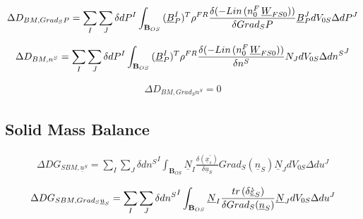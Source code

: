 \documentclass[12pt]{article}
\begin{document}
	\begin{equation*}
		\begin{aligned}
			\Delta D_{BM,  {Grad_{S}}P}=\sum_{I}\sum_{J}{\delta dP^{I}}\int_{\mathbf{B}_{OS}}{{(\underline{B}_{P}^{I})^{T}}{\rho^{FR}}}{\frac{\delta (-Lin\hspace{0.5mm} ({n_{0}^{F}}\hspace{0.5mm}{\underline{W}_{FS0}}))}{\delta {Grad_{S}}P }}{\underline{B}_{P}^{J}}{dV_{0S}}{\Delta dP^{J}}
		\end{aligned}    
	\end{equation*}
	
	\begin{equation*}
		\begin{aligned}
			\Delta D_{BM,  n^{S}}=\sum_{I}\sum_{J}{\delta dP^{I}}\int_{\mathbf{B}_{OS}}{{(\underline{B}_{P}^{I})^{T}}{\rho^{FR}}}{\frac{\delta (-Lin\hspace{0.5mm} ({n_{0}^{F}}\hspace{0.5mm}{\underline{W}_{FS0}}))}{\delta n^{S}}}{N_{J}}{dV_{0S}}{\Delta d{n^{S}}^{J}}
		\end{aligned}    
	\end{equation*}
	
	\begin{equation*}
		\begin{aligned}
			\Delta D_{BM,  {Grad_{S}}{n^{S}}}=0
		\end{aligned}    
	\end{equation*}
	
	
	\subsection{Solid Mass Balance}
	\begin{equation*}
		\begin{aligned}
			\Delta DG_{SBM, \underline{u}^{S}}=\sum_{I}\sum_{J}{\delta d{n^S}^{I}}\int_{\mathbf{B}_{OS}}{\underline{N}_{I}}{\frac{\delta ({\underline{x}_{s}^{'}})}{\delta \underline{u}_{S}}{Grad_{S}}({\underline{n}_{S}}){\underline{N}_{J}}{dV_{0S}}{\Delta d{u}^{J}}}
		\end{aligned}    
	\end{equation*}
	
	\begin{equation*}
		\begin{aligned}
			\Delta DG_{SBM, {Grad_{S}}{\underline{u}_{S}}}= \sum_{I}\sum_{J}{\delta d{n^S}^{I}}\int_{\mathbf{B}_{OS}}{\underline{N}_{I}}{{\frac{{tr\hspace{0.5mm}(\delta\Dot{\underline{\varepsilon}}_{S})}}{\delta{Grad_{S}}({\underline{n}_{S}})}{\underline{N}_{J}}{dV_{0S}}{\Delta d{u}^{J}}}}
		\end{aligned}    
	\end{equation*}
	
\end{document}

